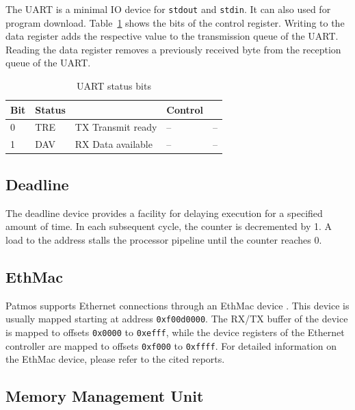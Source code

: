 \documentclass[a4paper,fontsize=10pt,twoside,DIV15,BCOR12mm,headinclude=true,footinclude=false,pagesize,bibtotoc]{scrbook}
\newcommand{\code}[1]{{\texttt{#1}}}
\begin{document}
The UART is a minimal IO device for \texttt{stdout} and
\texttt{stdin}.  It can also used for program
download. Table~\ref{tab:uart} shows the bits of the control
register. Writing to the data register adds the respective value to
the transmission queue of the UART. Reading the data register removes
a previously received byte from the reception queue of the UART.

\begin{table}
\centering
\begin{tabular}{lllll}
\toprule
Bit & Status & & Control & \\
\midrule
0 & TRE & TX Transmit ready & -- & -- \\
1 & DAV & RX Data available & -- & -- \\
\bottomrule
\end{tabular}
\caption{UART status bits} %
\label{tab:uart}
\end{table}


\subsection{Deadline}

The deadline device provides a facility for delaying execution for a
specified amount of time.
In each subsequent cycle, the counter is decremented by 1.
A load to the address stalls the processor pipeline until the counter
reaches 0.

\subsection{EthMac}
\label{sec:ethmac}

Patmos supports Ethernet connections through an EthMac device
\cite{mohor2002ethernet,pezzarossa2015ethernet}. This device is
usually mapped starting at address \code{0xf00d0000}. The RX/TX buffer
of the device is mapped to offsets \code{0x0000} to \code{0xefff},
while the device registers of the Ethernet controller are mapped to
offsets \code{0xf000} to \code{0xffff}. For detailed information on
the EthMac device, please refer to the cited reports.

\subsection{Memory Management Unit}
\end{document}
